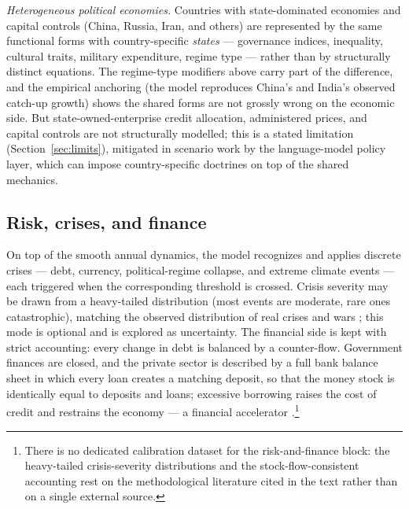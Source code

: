 \documentclass[a4paper,fleqn]{cas-sc}
\begin{document}
\emph{Heterogeneous political economies.} Countries with state-dominated economies and capital
controls (China, Russia, Iran, and others) are represented by the same functional forms with
country-specific \emph{states} --- governance indices, inequality, cultural traits, military
expenditure, regime type --- rather than by structurally distinct equations. The regime-type
modifiers above carry part of the difference, and the empirical anchoring (the model reproduces
China's and India's observed catch-up growth) shows the shared forms are not grossly wrong on the
economic side. But state-owned-enterprise credit allocation, administered prices, and capital
controls are not structurally modelled; this is a stated limitation
(Section~\ref{sec:limits}), mitigated in scenario work by the language-model policy layer, which
can impose country-specific doctrines on top of the shared mechanics.

\subsection{Risk, crises, and finance}


On top of the smooth annual dynamics, the model recognizes and applies discrete crises --- debt,
currency, political-regime collapse, and extreme climate events --- each triggered when the
corresponding threshold is crossed. Crisis severity may be drawn from a heavy-tailed distribution
(most events are moderate, rare ones catastrophic), matching the observed distribution of real
crises and wars \citep{taleb2007,weitzman2009}; this mode is optional and is explored as uncertainty.
The financial side is kept with strict accounting: every change in debt is balanced by a
counter-flow. Government finances are closed, and the private sector is described by a full bank
balance sheet in which every loan creates a matching deposit, so that the money stock is identically
equal to deposits and loans; excessive borrowing raises the cost of credit and restrains the economy
--- a financial accelerator \citep{bernanke1999,godley2007}.\footnote{There is no dedicated
calibration dataset for the risk-and-finance block: the heavy-tailed crisis-severity distributions
and the stock-flow-consistent accounting rest on the methodological literature cited in the text
rather than on a single external source.}
\end{document}
